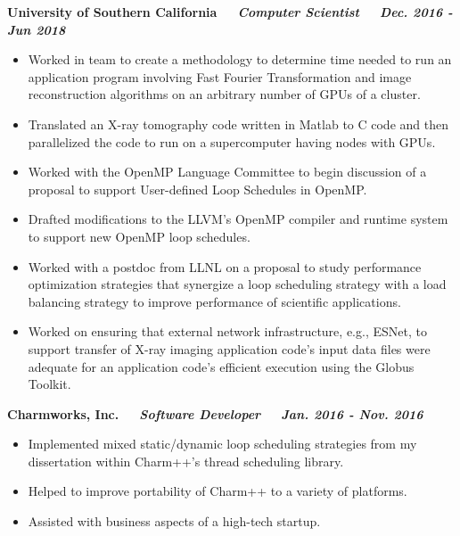 {\bf University of Southern California $\>$$\>$$\>$$\>$ \textit{Computer Scientist} $\>$$\>$$\>$$\>$ \textit{Dec. 2016 - Jun 2018}}
\vspace*{-0.0in} 
\begin{itemize}
\item Worked in team to create a methodology to determine time needed to run an application program involving Fast Fourier Transformation and image reconstruction algorithms on an arbitrary number of GPUs of a cluster.
\item Translated an X-ray tomography code written in Matlab to C code and then parallelized the code to run on a supercomputer having nodes with GPUs.
\item Worked with the OpenMP Language Committee to begin discussion of a proposal to support User-defined Loop Schedules in OpenMP. 
\item Drafted modifications to the LLVM's OpenMP compiler and runtime system to support new OpenMP loop schedules. 
\item Worked with a postdoc from LLNL on a proposal to study performance optimization strategies that synergize a loop scheduling strategy with a load balancing strategy to improve performance of scientific applications.
\item Worked on ensuring that external network infrastructure, e.g., ESNet, to support transfer of X-ray imaging application code's input data files were adequate for an application code's efficient execution using the Globus Toolkit.
\end{itemize}

{\bf Charmworks, Inc. $\>$$\>$$\>$$\>$ \textit{Software Developer} $\>$$\>$$\>$$\>$ \textit{Jan. 2016 - Nov. 2016}}
\vspace*{-0.0in}
\begin{itemize}
\item Implemented mixed static/dynamic loop scheduling strategies from my dissertation within Charm++'s thread scheduling library.
\item Helped to improve portability of Charm++ to a variety of platforms. 
\item Assisted with business aspects of a high-tech startup.
\end{itemize}

